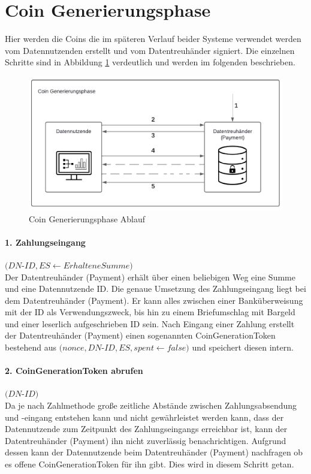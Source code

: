 \documentclass[11pt,a4paper]{scrreprt}
\begin{document}
\section{Coin Generierungsphase}
Hier werden die Coins die im späteren Verlauf beider Systeme verwendet werden vom Datennutzenden erstellt und vom Datentreuhänder signiert. Die einzelnen Schritte sind in Abbildung \ref{fig:coin-generationphase} verdeutlich und werden im folgenden beschrieben.
\begin{figure}[H]
    \centering
    \includegraphics[width=0.9\linewidth]{CoinGenerationPhaseDiagramm.pdf}
    \caption{Coin Generierungsphase Ablauf}
    \label{fig:coin-generationphase}
\end{figure}

\paragraph{1. Zahlungseingang} $(DN$-$ID, ES \leftarrow ErhalteneSumme)$\\
Der Datentreuhänder (Payment) erhält über einen beliebigen Weg eine Summe und eine Datennutzende ID. Die genaue Umsetzung des Zahlungseingang liegt bei dem Datentreuhänder (Payment). Er kann alles zwischen einer Banküberweisung mit der ID als Verwendungszweck, bis hin zu einem Briefumschlag mit Bargeld und einer leserlich aufgeschrieben ID sein. Nach Eingang einer Zahlung erstellt der Datentreuhänder (Payment) einen sogenannten CoinGenerationToken bestehend aus $(nonce, DN$-$ID, ES, spent \leftarrow false)$ und speichert diesen intern.

\paragraph{2. CoinGenerationToken abrufen} $(DN$-$ID)$\\
Da je nach Zahlmethode große zeitliche Abstände zwischen Zahlungsabsendung und -eingang entstehen kann und nicht gewährleistet werden kann, dass der Datennutzende zum Zeitpunkt des Zahlungseingangs erreichbar ist, kann der Datentreuhänder (Payment) ihn nicht zuverlässig benachrichtigen. Aufgrund dessen kann der Datennutzende beim Datentreuhänder (Payment) nachfragen ob es offene CoinGenerationToken für ihn gibt. Dies wird in diesem Schritt getan.
\end{document}
